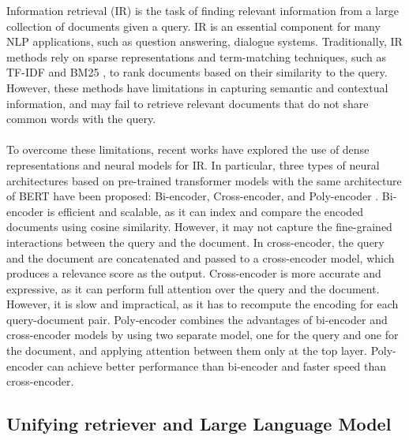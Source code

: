 Information retrieval (IR) is the task of finding relevant information from a large collection of documents given a query. IR is an essential component for many NLP applications, such as question answering, dialogue systems. Traditionally, IR methods rely on sparse representations and term-matching techniques, such as TF-IDF \cite{ref1} and BM25 \cite{Amati2009}, to rank documents based on their similarity to the query. However, these methods have limitations in capturing semantic and contextual information, and may fail to retrieve relevant documents that do not share common words with the query.\\\\
To overcome these limitations, recent works have explored the use of dense representations and neural models for IR. In particular, three types of neural architectures based on pre-trained transformer models with the same architecture of BERT \cite{devlin-etal-2019-bert} have been proposed: Bi-encoder, Cross-encoder, and Poly-encoder \cite{Humeau2020Poly-encoders:}. Bi-encoder is efficient and scalable, as it can index and compare the encoded documents using cosine similarity. However, it may not capture the fine-grained interactions between the query and the document. In cross-encoder,  the query and the document are concatenated and passed to a cross-encoder model, which produces a relevance score as the output. Cross-encoder is more accurate and expressive, as it can perform full attention over the query and the document. However, it is slow and impractical, as it has to recompute the encoding for each query-document pair. Poly-encoder combines the advantages of bi-encoder and cross-encoder models by using two separate model, one for the query and one for the document, and applying attention between them only at the top layer. Poly-encoder can achieve better performance than bi-encoder and faster speed than cross-encoder.


\subsection{Unifying retriever and Large Language Model}

